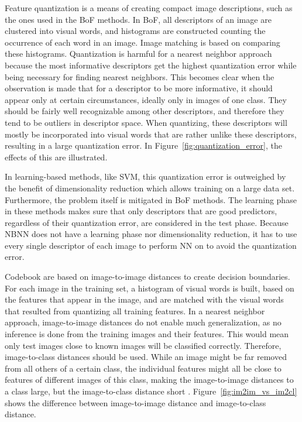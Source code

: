 Feature quantization is a means of creating compact image descriptions, such as the ones used in the BoF methods. In BoF, all descriptors of an image are clustered into visual words, and histograms are constructed counting the occurrence of each word in an image. Image matching is based on comparing these histograms. Quantization is harmful for a nearest neighbor approach because the most informative descriptors get the highest quantization error while being necessary for finding nearest neighbors. This becomes clear when the observation is made that for a descriptor to be more informative, it should appear only at certain circumstances, ideally only in images of one class. They should be fairly well recognizable among other descriptors, and therefore they tend to be outliers in descriptor space. When quantizing, these descriptors will mostly be incorporated into visual words that are rather unlike these descriptors, resulting in a large quantization error. In Figure~\ref{fig:quantization_error}, the effects of this are illustrated.

In learning-based methods, like SVM, this quantization error is outweighed by the benefit of dimensionality reduction which allows training on a large data set. Furthermore, the problem itself is mitigated in BoF methods. The learning phase in these methods makes sure that only descriptors that are good predictors, regardless of their quantization error, are considered in the test phase. Because NBNN does not have a learning phase nor dimensionality reduction, it has to use every single descriptor of each image to perform NN on to avoid the quantization error.

Codebook are based on image-to-image distances to create decision boundaries. For each image in the training set, a histogram of visual words is built, based on the features that appear in the image, and are matched with the visual words that resulted from quantizing all training features. 
In a nearest neighbor approach, image-to-image distances do not enable much generalization, as no inference is done from the training images and their features. This would mean only test images close to known images will be classified correctly. Therefore, image-to-class distances should be used. While an image might be far removed from all others of a certain class, the individual features might all be close to features of different images of this class, making the image-to-image distances to a class large, but the image-to-class distance short \cite{wang2009learning}. Figure~\ref{fig:im2im_vs_im2cl} shows the difference between image-to-image distance and image-to-class distance.

